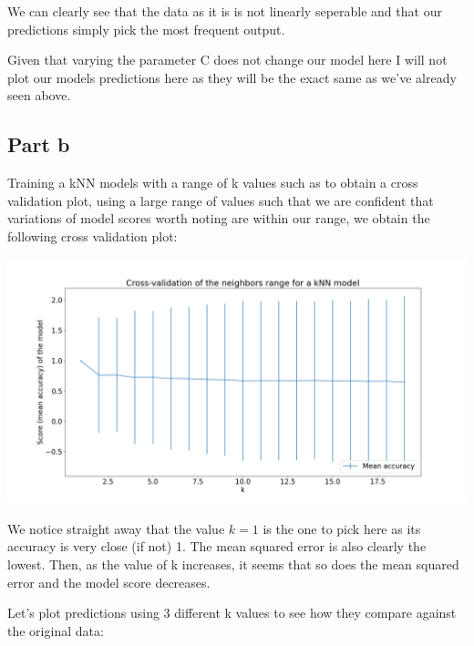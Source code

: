 \documentclass[10pt]{article}
\begin{document}
We can clearly see that the data as it is is not linearly seperable and that our predictions
simply pick the most frequent output.

\vspace{5mm} %

Given that varying the parameter C does not change our model here I will not plot our models
predictions here as they will be the exact same as we've already seen above.

\subsection*{Part b}

Training a kNN models with a range of k values such as to obtain a cross validation plot, using
a large range of values such that we are confident that variations of model scores worth noting
are within our range, we obtain the following cross validation plot:

\begin{center}
    \includegraphics[scale=0.25]{ds_2_knn_cv.png}
\end{center}
\vspace{5mm} %

We notice straight away that the value $ k = 1 $ is the one to pick
here as its accuracy is very close (if not) 1. The mean squared error is also clearly the lowest.
Then, as the value of k increases, it seems that so does the mean squared error and the model score
decreases. 
\par
Let's plot predictions using 3 different k values to see how they compare 
against the original data:
\end{document}
